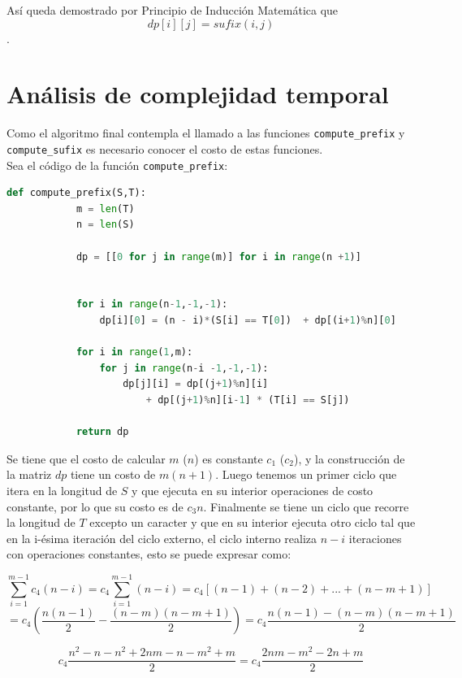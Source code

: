 \documentclass[a4paper]{article}
\begin{document}
	Así queda demostrado por Principio de Inducción Matemática que $$dp[i][j]=sufix(i,j)$$.
	
	

   
    \section*{An\'alisis de complejidad temporal}

    Como el algoritmo final contempla el llamado a las funciones \texttt{compute\_prefix} y \texttt{compute\_sufix}
    es necesario conocer el costo de estas funciones.\\ 

    Sea el c\'odigo de la funci\'on \texttt{compute\_prefix}: 

    \begin{lstlisting}[language=Python]
        def compute_prefix(S,T):
            m = len(T)
            n = len(S)

            dp = [[0 for j in range(m)] for i in range(n +1)]

    
            for i in range(n-1,-1,-1):
                dp[i][0] = (n - i)*(S[i] == T[0])  + dp[(i+1)%n][0] 

            for i in range(1,m):
                for j in range(n-i -1,-1,-1):
                    dp[j][i] = dp[(j+1)%n][i] 
                        + dp[(j+1)%n][i-1] * (T[i] == S[j])

            return dp
    \end{lstlisting}

    Se tiene que el costo de calcular $m$ ($n$) es constante $c_1$ ($c_2$), y la construcci\'on de la matriz $dp$ tiene un costo de 
    $m(n+1)$. Luego tenemos un primer ciclo que itera en la longitud de $S$ y que ejecuta en su interior operaciones de 
    costo constante, por lo que su costo es de $c_3n$. Finalmente se tiene un ciclo que recorre la longitud de $T$ excepto un caracter y que 
    en su interior ejecuta otro ciclo tal que en la i-\'esima iteraci\'on del ciclo externo, el ciclo interno realiza $n-i$ iteraciones con operaciones constantes, esto se puede expresar como:

    $$\sum_{i=1}^{m-1} c_4(n-i) = c_4\sum_{i=1}^{m-1} (n-i) = c_4 [ (n-1) + (n-2) + ... + (n-m +1)] $$ 
    $$ = c_4 \left( \frac{n(n-1)}{2} - \frac{(n-m)(n-m+1)}{2} \right) = c_4 \frac{n(n-1) - (n-m)(n-m+1)}{2} $$

    $$ c_4\frac{n^2 - n - n^2 + 2nm - n - m^2 + m}{2} = c_4 \frac{2nm - m^2 - 2n + m}{2}$$
            
\end{document}
